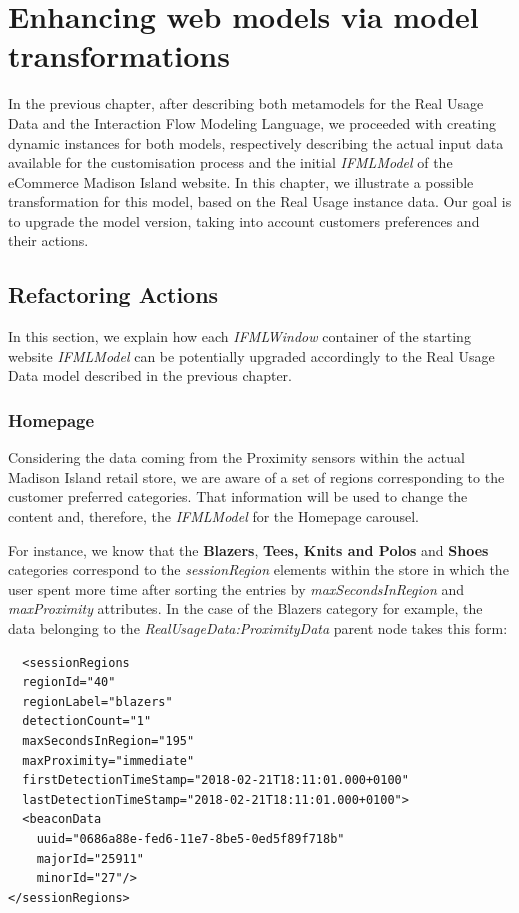 \chead{}

\chapter{Enhancing web models via model transformations}
\label{enhancing-web-models-via-model-transformations}

In the previous chapter, after describing both metamodels for the Real Usage Data and the Interaction Flow Modeling Language, we proceeded with creating dynamic instances for both models, respectively describing the actual input data available for the customisation process and the initial \textit{IFMLModel} of the eCommerce Madison Island website. In this chapter, we illustrate a possible transformation for this model, based on the Real Usage instance data. Our goal is to upgrade the model version, taking into account customers preferences and their actions.


\section{Refactoring Actions}

In this section, we explain how each \textit{IFMLWindow} container of the starting website \textit{IFMLModel} can be potentially upgraded accordingly to the Real Usage Data model described in the previous chapter.

\subsection{Homepage}
\label{homepage-updates}

Considering the data coming from the Proximity sensors within the actual Madison Island retail store, we are aware of a set of regions corresponding to the customer preferred categories. That information will be used to change the content and, therefore, the \textit{IFMLModel} for the Homepage carousel.

For instance, we know that the \textbf{Blazers}, \textbf{Tees, Knits and Polos} and \textbf{Shoes} categories correspond to the \textit{sessionRegion} elements within the store in which the user spent more time after sorting the entries by \textit{maxSecondsInRegion} and \textit{maxProximity} attributes. In the case of the Blazers category for example, the data belonging to the \textit{RealUsageData:ProximityData} parent node takes this form:

\vspace{0.5cm}
\lstset{language=XML}
\begin{lstlisting} 
  <sessionRegions
  regionId="40"
  regionLabel="blazers"
  detectionCount="1"
  maxSecondsInRegion="195"
  maxProximity="immediate"
  firstDetectionTimeStamp="2018-02-21T18:11:01.000+0100"
  lastDetectionTimeStamp="2018-02-21T18:11:01.000+0100">
  <beaconData
    uuid="0686a88e-fed6-11e7-8be5-0ed5f89f718b"
    majorId="25911"
    minorId="27"/>
</sessionRegions>
\end{lstlisting}
\vspace{0.5cm}

